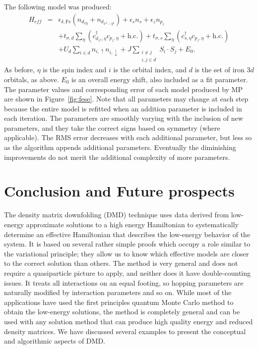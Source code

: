 \documentclass[aps, prb, 11pt]{revtex4-1}
\begin{document}
The following model was produced:
\begin{eqnarray}
  H_{eff} &=& \epsilon_{\delta,\mathrm{Fe}} (n_{d_{xy}} + n_{d_{x^2-y^2}}) + \epsilon_s n_{s}+\epsilon_{z} n_{p_z} \nonumber \\
          &&+ t_{\sigma,d} \sum_{\eta} \left( c_{d_{z^2},\eta}^{\dagger} c_{p_z,\eta} + \text{h.c.} \right)+t_{\sigma,s} \sum_{\eta} \left(c_{s,\eta}^{\dagger}  c_{p_z,\eta} + \text{h.c.} \right)
              \nonumber \\
          &&+ U_d \sum_{i \in d} n_{i,\uparrow} n_{i,\downarrow} + J \sum_{\substack{i\ne j \\i,j \in d}} S_i \cdot S_j + E_0. \label{eq:fesemodel}
\end{eqnarray}
As before, $\eta$ is the spin index and $i$ is the orbital index, and $d$ is the set of iron $3d$ orbitals, as above.
$E_0$ is an overall energy shift, also included as a fit parameter.
The parameter values and corresponding error of each model produced by MP are shown in Figure~\ref{fig:fese}.
Note that all parameters may change at each step because the entire model is refitted when an addition parameter is included in each iteration.
The parameters are smoothly varying with the inclusion of new parameters, and they take the correct signs based on symmetry (where applicable). 
The RMS error decreases with each additional parameter, but less so as the algorithm appends additional parameters. 
Eventually the diminishing improvements do not merit the additional complexity of more parameters.

\section{Conclusion and Future prospects}
\label{sec:conclusion}
The density matrix downfolding (DMD) technique uses data derived from low-energy approximate solutions to a high energy Hamiltonian to systematically determine an effective Hamiltonian that describes the low-energy behavior of the system.
It is based on several rather simple proofs which occupy a role similar to the variational principle; they allow us to know which effective models are closer to the correct solution than others. 
The method is very general and does not require a quasiparticle picture to apply, and neither does it have double-counting issues.
It treats all interactions on an equal footing, so hopping parameters are naturally modified by interaction parameters and so on.
While most of the applications have used the first principles quantum Monte Carlo method to obtain the low-energy solutions, the method is completely general and can be used with any solution method that can produce high quality energy and reduced density matrices.  
We have discussed several examples to present the conceptual and algorithmic aspects of DMD. 
\end{document}
